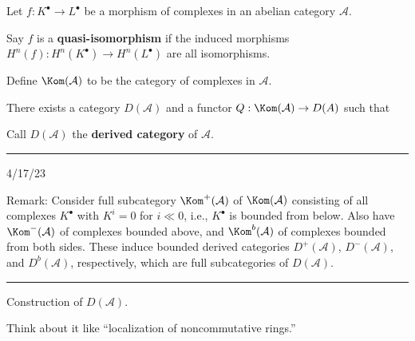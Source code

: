 \documentclass[12pt]{article}
\newcommand{\keyword}[1]{\textbf{#1}}
\newcommand{\sepline}{\rule{\textwidth}{0.4pt}}
\newenvironment{cd}{\begin{center}\begin{tikzcd}}{\end{tikzcd}\end{center}}
\theoremstyle{definition}
\renewcommand{\AA}{\mathcal{A}}
\newcommand{\DD}{\mathcal{D}}
\newcommand{\<}{\left\langle}
\renewcommand{\>}{\right\rangle}
\renewcommand{\_}[1]{{_{#1}}}
\begin{document}
Let $f : K^\bullet \to L^\bullet$ be a morphism of complexes in an abelian category $\AA$.

Say $f$ is a \keyword{quasi-isomorphism} if the induced morphisms $H^n(f) : H^n(K^\bullet) \to H^n(L^\bullet)$ are all isomorphisms.

Define $\Kom(\AA)$ to be the category of complexes in $\AA$.

There exists a category $D(\AA)$ and a functor $Q : \Kom(\AA) \to D(A)$ such that
Call $D(\AA)$ the \keyword{derived category} of $\AA$.

\sepline

4/17/23

Remark: Consider full subcategory $\Kom^+(\AA)$ of $\Kom(\AA)$ consisting of all complexes $K^\bullet$ with $K^i = 0$ for $i \ll 0$, i.e., $K^\bullet$ is bounded from below.
Also have $\Kom^-(\AA)$ of complexes bounded above, and $\Kom^b(\AA)$ of complexes bounded from both sides.
These induce bounded derived categories $D^+(\AA)$, $D^-(\AA)$, and $D^b(\AA)$, respectively, which are full subcategories of $D(\AA)$.


\sepline

Construction of $D(\AA)$.

Think about it like ``localization of noncommutative rings.''
\end{document}
